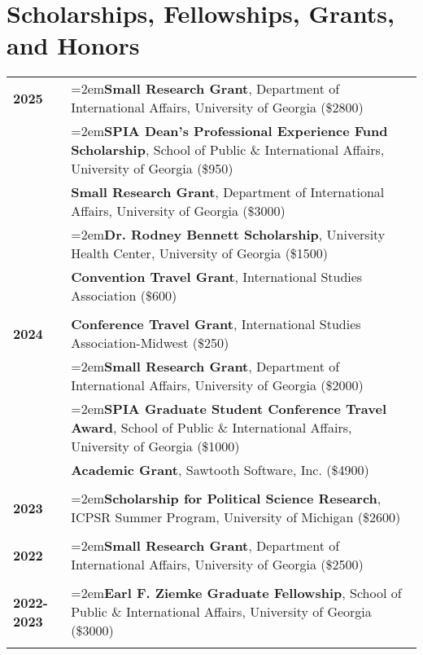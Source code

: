 \documentclass[letterpaper,12pt]{article}
\begin{document}
\section{Scholarships, Fellowships, Grants, and Honors}
\begin{xltabular}{\dimexpr\textwidth-0in}{p{.85in}X}
\textbf{2025}          & \hangindent=2em\textbf{Small Research Grant}, Department of International Affairs, University of Georgia (\$2800)\\
                              & \hangindent=2em\textbf{SPIA Dean's Professional Experience Fund Scholarship}, School of Public \& \mbox{International} Affairs, University of Georgia (\$950)\\
                              & \textbf{Small Research Grant}, Department of International Affairs, University of Georgia (\$3000) \\
                              & \hangindent=2em\textbf{Dr. Rodney Bennett Scholarship}, University Health Center, University of Georgia (\$1500)\\
                              & \textbf{Convention Travel Grant}, International Studies Association (\$600)\\ \\
\textbf{2024}          & \textbf{Conference Travel Grant}, International Studies Association-Midwest (\$250)\\
                              & \hangindent=2em\textbf{Small Research Grant}, Department of International Affairs, University of Georgia (\$2000)\\
                              & \hangindent=2em\textbf{SPIA Graduate Student Conference Travel Award}, School of Public \& \mbox{International} Affairs, University of Georgia (\$1000)\\
                              & \textbf{Academic Grant}, Sawtooth Software, Inc. (\$4900)\\ \\
\textbf{2023}          & \hangindent=2em\textbf{Scholarship for Political Science Research}, ICPSR Summer Program, University of \mbox{Michigan} (\$2600)\\ \\
\textbf{2022}          & \hangindent=2em\textbf{Small Research Grant}, Department of International Affairs, University of Georgia (\$2500)\\ \\
\textbf{2022-2023} & \hangindent=2em\textbf{Earl F. Ziemke Graduate Fellowship}, School of Public \& International Affairs, \mbox{University} of Georgia (\$3000)\\ \\

\end{xltabular}
\end{document}
